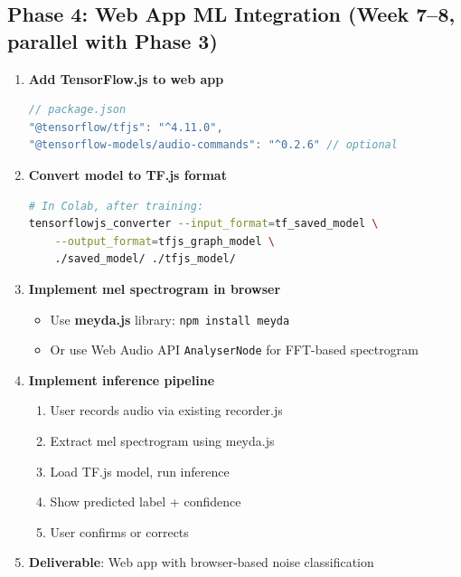 \documentclass[11pt,a4paper]{article}
\begin{document}
\subsection{Phase 4: Web App ML Integration (Week 7--8, parallel with Phase 3)}

\begin{enumerate}[leftmargin=*,noitemsep]
    \item \textbf{Add TensorFlow.js to web app}
    \begin{lstlisting}[language=JavaScript]
// package.json
"@tensorflow/tfjs": "^4.11.0",
"@tensorflow-models/audio-commands": "^0.2.6" // optional
\end{lstlisting}
    
    \item \textbf{Convert model to TF.js format}
    \begin{lstlisting}[language=bash]
# In Colab, after training:
tensorflowjs_converter --input_format=tf_saved_model \
    --output_format=tfjs_graph_model \
    ./saved_model/ ./tfjs_model/
\end{lstlisting}
    
    \item \textbf{Implement mel spectrogram in browser}
    \begin{itemize}[leftmargin=*,noitemsep]
        \item Use \textbf{meyda.js} library: \texttt{npm install meyda}
        \item Or use Web Audio API \texttt{AnalyserNode} for FFT-based spectrogram
    \end{itemize}
    
    \item \textbf{Implement inference pipeline}
    \begin{enumerate}
        \item User records audio via existing recorder.js
        \item Extract mel spectrogram using meyda.js
        \item Load TF.js model, run inference
        \item Show predicted label + confidence
        \item User confirms or corrects
    \end{enumerate}
    
    \item \textbf{Deliverable}: Web app with browser-based noise classification
\end{enumerate}
\end{document}
